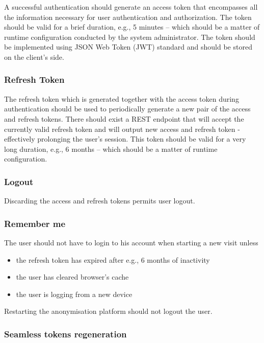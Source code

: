 \documentclass[a4paper,twoside,12pt]{book}
\begin{document}
A successful authentication should generate an access token that encompasses all the information necessary for user authentication and authorization. The token should be valid for a brief duration, e.g., 5 minutes – which should be a matter of runtime configuration conducted by the system administrator. The token should be implemented using JSON Web Token (JWT) standard and should be stored on the client's side.

\subsubsection{Refresh Token}

The refresh token which is generated together with the access token during authentication should be used to periodically generate a new pair of the access and refresh tokens. There should exist a REST endpoint that will accept the currently valid refresh token and will output new access and refresh token - effectively prolonging the user's session. This token should be valid for a very long duration, e.g., 6 months – which should be a matter of runtime configuration.

\subsubsection{Logout}

Discarding the access and refresh tokens permits user logout.

\subsubsection{Remember me}

The user should not have to login to his account when starting a new visit unless
\begin{itemize}
\item the refresh token has expired after e.g., 6 months of inactivity
\item the user has cleared browser's cache
\item the user is logging from a new device
\end{itemize}

Restarting the anonymisation platform should not logout the user.

\subsubsection{Seamless tokens regeneration}
\end{document}
